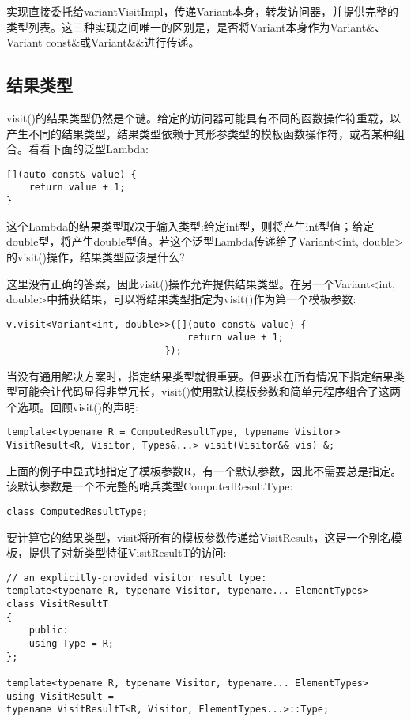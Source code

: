 实现直接委托给variantVisitImpl，传递Variant本身，转发访问器，并提供完整的类型列表。这三种实现之间唯一的区别是，是否将Variant本身作为Variant\&、Variant const\&或Variant\&\&进行传递。

\subsection{结果类型}

visit()的结果类型仍然是个谜。给定的访问器可能具有不同的函数操作符重载，以产生不同的结果类型，结果类型依赖于其形参类型的模板函数操作符，或者某种组合。看看下面的泛型Lambda:

\begin{lstlisting}[style=styleCXX]
[](auto const& value) {
	return value + 1;
}
\end{lstlisting}

这个Lambda的结果类型取决于输入类型:给定int型，则将产生int型值；给定double型，将产生double型值。若这个泛型Lambda传递给了Variant<int, double>的visit()操作，结果类型应该是什么?

这里没有正确的答案，因此visit()操作允许提供结果类型。在另一个Variant<int, double>中捕获结果，可以将结果类型指定为visit()作为第一个模板参数:

\begin{lstlisting}[style=styleCXX]
v.visit<Variant<int, double>>([](auto const& value) {
								return value + 1;
							});
\end{lstlisting}

当没有通用解决方案时，指定结果类型就很重要。但要求在所有情况下指定结果类型可能会让代码显得非常冗长，visit()使用默认模板参数和简单元程序组合了这两个选项。回顾visit()的声明:

\begin{lstlisting}[style=styleCXX]
template<typename R = ComputedResultType, typename Visitor>
VisitResult<R, Visitor, Types&...> visit(Visitor&& vis) &;
\end{lstlisting}

上面的例子中显式地指定了模板参数R，有一个默认参数，因此不需要总是指定。该默认参数是一个不完整的哨兵类型ComputedResultType:

\begin{lstlisting}[style=styleCXX]
class ComputedResultType;
\end{lstlisting}

要计算它的结果类型，visit将所有的模板参数传递给VisitResult，这是一个别名模板，提供了对新类型特征VisitResultT的访问:

\begin{lstlisting}[style=styleCXX]
// an explicitly-provided visitor result type:
template<typename R, typename Visitor, typename... ElementTypes>
class VisitResultT
{
	public:
	using Type = R;
};

template<typename R, typename Visitor, typename... ElementTypes>
using VisitResult =
typename VisitResultT<R, Visitor, ElementTypes...>::Type;
\end{lstlisting}

